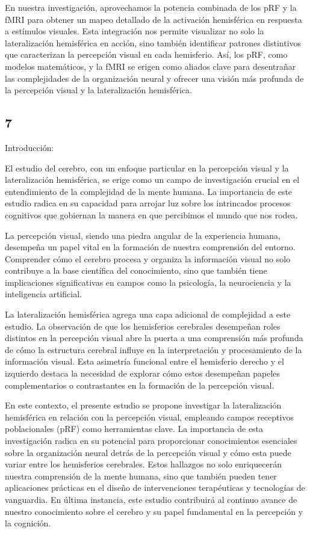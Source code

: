 \documentclass{article}
\begin{document}
	En nuestra investigación, aprovechamos la potencia combinada de los pRF y la fMRI para obtener un mapeo detallado de la activación hemisférica en respuesta a estímulos visuales. Esta integración nos permite visualizar no solo la lateralización hemisférica en acción, sino también identificar patrones distintivos que caracterizan la percepción visual en cada hemisferio. Así, los pRF, como modelos matemáticos, y la fMRI se erigen como aliados clave para desentrañar las complejidades de la organización neural y ofrecer una visión más profunda de la percepción visual y la lateralización hemisférica.
	
	\subsection{7}
	
	Introducción:
	
	El estudio del cerebro, con un enfoque particular en la percepción visual y la lateralización hemisférica, se erige como un campo de investigación crucial en el entendimiento de la complejidad de la mente humana. La importancia de este estudio radica en su capacidad para arrojar luz sobre los intrincados procesos cognitivos que gobiernan la manera en que percibimos el mundo que nos rodea.
	
	La percepción visual, siendo una piedra angular de la experiencia humana, desempeña un papel vital en la formación de nuestra comprensión del entorno. Comprender cómo el cerebro procesa y organiza la información visual no solo contribuye a la base científica del conocimiento, sino que también tiene implicaciones significativas en campos como la psicología, la neurociencia y la inteligencia artificial.
	
	La lateralización hemisférica agrega una capa adicional de complejidad a este estudio. La observación de que los hemisferios cerebrales desempeñan roles distintos en la percepción visual abre la puerta a una comprensión más profunda de cómo la estructura cerebral influye en la interpretación y procesamiento de la información visual. Esta asimetría funcional entre el hemisferio derecho y el izquierdo destaca la necesidad de explorar cómo estos desempeñan papeles complementarios o contrastantes en la formación de la percepción visual.
	
	En este contexto, el presente estudio se propone investigar la lateralización hemisférica en relación con la percepción visual, empleando campos receptivos poblacionales (pRF) como herramientas clave. La importancia de esta investigación radica en su potencial para proporcionar conocimientos esenciales sobre la organización neural detrás de la percepción visual y cómo esta puede variar entre los hemisferios cerebrales. Estos hallazgos no solo enriquecerán nuestra comprensión de la mente humana, sino que también pueden tener aplicaciones prácticas en el diseño de intervenciones terapéuticas y tecnologías de vanguardia. En última instancia, este estudio contribuirá al continuo avance de nuestro conocimiento sobre el cerebro y su papel fundamental en la percepción y la cognición.
	
\end{document}
